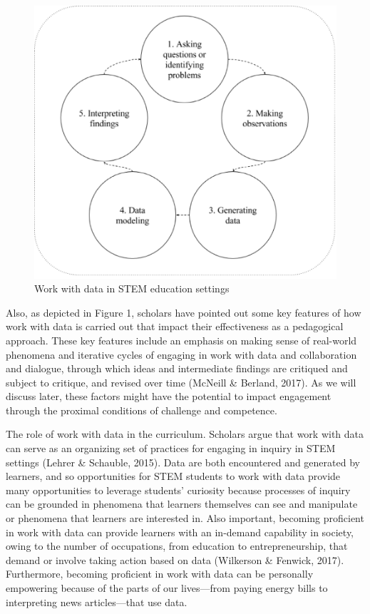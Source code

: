 \documentclass[]{msu-thesis}
\theoremstyle{definition}
\theoremstyle{definition}
\theoremstyle{definition}
\theoremstyle{remark}
\begin{document}
\begin{figure}

{\centering \includegraphics[width=0.8\linewidth]{images/figure1} 

}

\caption{Work with data in STEM education settings}\label{fig:unnamed-chunk-1}
\end{figure}

Also, as depicted in Figure 1, scholars have pointed out some key
features of how work with data is carried out that impact their
effectiveness as a pedagogical approach. These key features include an
emphasis on making sense of real-world phenomena and iterative cycles of
engaging in work with data and collaboration and dialogue, through which
ideas and intermediate findings are critiqued and subject to critique,
and revised over time (McNeill \& Berland, 2017). As we will discuss
later, these factors might have the potential to impact engagement
through the proximal conditions of challenge and competence.

The role of work with data in the curriculum. Scholars argue that work
with data can serve as an organizing set of practices for engaging in
inquiry in STEM settings (Lehrer \& Schauble, 2015). Data are both
encountered and generated by learners, and so opportunities for STEM
students to work with data provide many opportunities to leverage
students' curiosity because processes of inquiry can be grounded in
phenomena that learners themselves can see and manipulate or phenomena
that learners are interested in. Also important, becoming proficient in
work with data can provide learners with an in-demand capability in
society, owing to the number of occupations, from education to
entrepreneurship, that demand or involve taking action based on data
(Wilkerson \& Fenwick, 2017). Furthermore, becoming proficient in work
with data can be personally empowering because of the parts of our
lives---from paying energy bills to interpreting news articles---that
use data.
\end{document}

